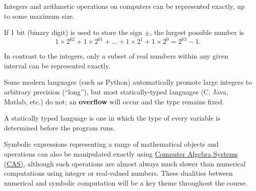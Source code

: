 \documentclass[
  letterpaper,
  DIV=11,
  numbers=noendperiod]{scrreprt}
\begin{document}
Integers and arithmetic operations on computers can be represented
exactly, up to some maximum size.

If 1 bit (binary digit) is used to store the sign \(\pm\), the largest
possible number is \[
1\times 2^{62} +1\times 2^{61} + \ldots + 1\times 2^{1} + 1\times 2^{0} = 2^{63}-1.
\]

In contrast to the integers, only a subset of real numbers within any
given interval can be represented exactly.

\begin{tcolorbox}[enhanced jigsaw, opacityback=0, breakable, title=\textcolor{quarto-callout-note-color}{\faInfo}\hspace{0.5em}{Note}, arc=.35mm, coltitle=black, opacitybacktitle=0.6, bottomrule=.15mm, leftrule=.75mm, left=2mm, colbacktitle=quarto-callout-note-color!10!white, titlerule=0mm, toptitle=1mm, bottomtitle=1mm, colframe=quarto-callout-note-color-frame, rightrule=.15mm, colback=white, toprule=.15mm]

Some modern languages (such as Python) automatically promote large
integers to arbitrary precision (``long''), but most statically-typed
languages (C, Java, Matlab, etc.) do not; an \textbf{overflow} will
occur and the type remains fixed.

\end{tcolorbox}

\begin{tcolorbox}[enhanced jigsaw, opacityback=0, breakable, title=\textcolor{quarto-callout-note-color}{\faInfo}\hspace{0.5em}{Note}, arc=.35mm, coltitle=black, opacitybacktitle=0.6, bottomrule=.15mm, leftrule=.75mm, left=2mm, colbacktitle=quarto-callout-note-color!10!white, titlerule=0mm, toptitle=1mm, bottomtitle=1mm, colframe=quarto-callout-note-color-frame, rightrule=.15mm, colback=white, toprule=.15mm]

A statically typed language is one in which the type of every variable
is determined before the program runs.

\end{tcolorbox}

Symbolic expressions representing a range of mathematical objects and
operations can also be manipulated exactly using
\href{https://en.wikipedia.org/wiki/Computer_algebra_system}{Computer
Algebra Systems (CAS)}, although such operations are almost always much
slower than numerical computations using integer or real-valued numbers.
These dualities between numerical and symbolic computation will be a key
theme throughout the course.
\end{document}
